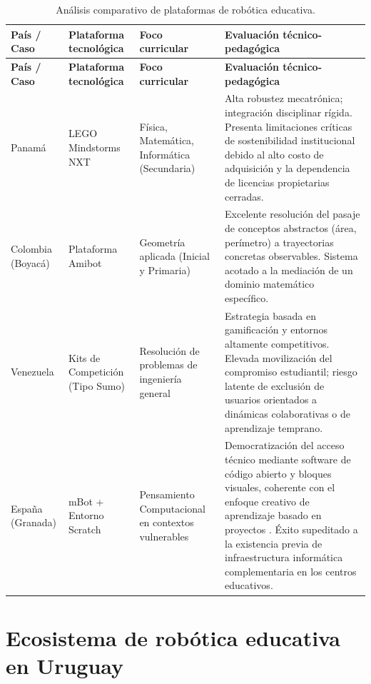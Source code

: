 \documentclass{prgrado}
\begin{document}
\begin{longtable}{>{\raggedright\arraybackslash}p{}
                  >{\raggedright\arraybackslash}p{}
                  >{\raggedright\arraybackslash}p{}
                  >{\raggedright\arraybackslash}p{}}
\caption{Análisis comparativo de plataformas de robótica educativa.}\\
\toprule
\textbf{País / Caso} & \textbf{Plataforma tecnológica} & \textbf{Foco curricular} & \textbf{Evaluación técnico-pedagógica} \\
\midrule
\endfirsthead
\toprule
\textbf{País / Caso} & \textbf{Plataforma tecnológica} & \textbf{Foco curricular} & \textbf{Evaluación técnico-pedagógica} \\
\midrule
\endhead
Panamá & LEGO Mindstorms NXT & Física, Matemática, Informática (Secundaria) & Alta robustez mecatrónica; integración disciplinar rígida. Presenta limitaciones críticas de sostenibilidad institucional debido al alto costo de adquisición y la dependencia de licencias propietarias cerradas. \\
\midrule
Colombia (Boyacá) & Plataforma Amibot & Geometría aplicada (Inicial y Primaria) & Excelente resolución del pasaje de conceptos abstractos (área, perímetro) a trayectorias concretas observables. Sistema acotado a la mediación de un dominio matemático específico. \\
\midrule
Venezuela & Kits de Competición (Tipo Sumo) & Resolución de problemas de ingeniería general & Estrategia basada en gamificación y entornos altamente competitivos. Elevada movilización del compromiso estudiantil; riesgo latente de exclusión de usuarios orientados a dinámicas colaborativas o de aprendizaje temprano. \\
\midrule
España (Granada) & mBot + Entorno Scratch \cite{scratchND} & Pensamiento Computacional en contextos vulnerables & Democratización del acceso técnico mediante software de código abierto y bloques visuales, coherente con el enfoque creativo de aprendizaje basado en proyectos \cite{resnickNDfourps}. Éxito supeditado a la existencia previa de infraestructura informática complementaria en los centros educativos. \\
\bottomrule
\end{longtable}

\section{Ecosistema de robótica educativa en Uruguay}
\end{document}
